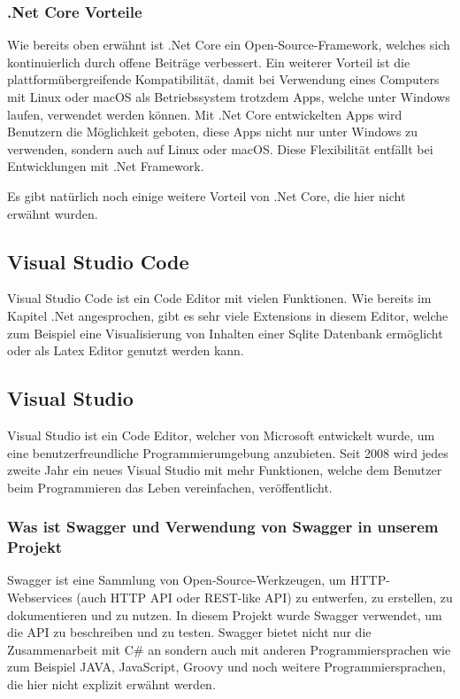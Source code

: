 \subsubsection*{.Net Core Vorteile}

Wie bereits oben erwähnt ist .Net Core ein Open-Source-Framework, welches sich kontinuierlich durch offene Beiträge verbessert.
Ein weiterer Vorteil ist die plattformübergreifende Kompatibilität, damit bei Verwendung eines Computers mit Linux oder macOS als Betriebssystem trotzdem Apps, welche unter Windows laufen, verwendet werden können.
Mit .Net Core entwickelten Apps wird Benutzern die Möglichkeit geboten, diese Apps nicht nur unter Windows zu verwenden, sondern auch auf Linux oder macOS. Diese Flexibilität entfällt bei Entwicklungen mit .Net Framework.

Es gibt natürlich noch einige weitere Vorteil von .Net Core, die hier nicht erwähnt wurden.

\subsection{Visual Studio Code}
Visual Studio Code ist ein Code Editor mit vielen Funktionen.
Wie bereits im Kapitel .Net angesprochen, gibt es sehr viele Extensions
in diesem Editor, welche zum Beispiel eine Visualisierung von Inhalten einer Sqlite Datenbank
ermöglicht oder als Latex Editor genutzt werden kann.

\subsection{Visual Studio}
Visual Studio ist ein Code Editor, welcher von Microsoft entwickelt wurde, um eine
benutzerfreundliche Programmierumgebung anzubieten. Seit 2008 wird jedes 
zweite Jahr ein neues Visual Studio mit mehr Funktionen, welche dem Benutzer 
beim Programmieren das Leben vereinfachen, veröffentlicht. 

\subsubsection*{Was ist Swagger und Verwendung von Swagger in unserem Projekt}

Swagger ist eine Sammlung von Open-Source-Werkzeugen, um HTTP-Webservices (auch HTTP API oder REST-like API) zu entwerfen, zu erstellen, 
zu dokumentieren und zu nutzen.
In diesem Projekt wurde Swagger verwendet, um die API zu beschreiben und zu testen.
Swagger bietet nicht nur die Zusammenarbeit mit C\# an sondern auch mit anderen Programmiersprachen wie zum Beispiel
JAVA, JavaScript, Groovy und noch weitere Programmiersprachen, die hier nicht explizit erwähnt werden. 

